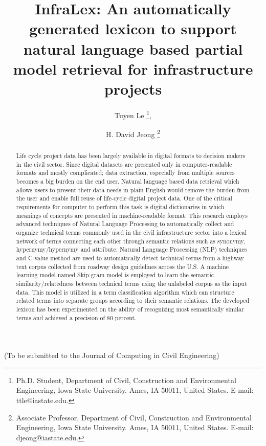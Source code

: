 \documentclass[Journal, InsideFigs, DoubleSpace]{ascelike} %
\begin{document}
\title{InfraLex: An automatically generated lexicon to support natural language based partial model retrieval for infrastructure projects}
%
\author{
Tuyen Le
\thanks{
Ph.D. Student, Department of Civil, Construction and Environmental Engineering, Iowa State University. Ames, IA 50011, United States. E-mail: ttle@iastate.edu.},
\and
H. David Jeong
\thanks{Associate Professor, Department of Civil, Construction and Environmental Engineering, Iowa State University. Ames, IA 50011, United States. E-mail: djeong@iastate.edu.}
 }

\maketitle
%
\begin{center}
(To be submitted to the Journal of Computing in Civil Engineering) 
\end{center}

\begin{abstract} %
	Life cycle project data has been largely available in digital formats to decision makers in the civil sector. Since digital datasets are presented only in computer-readable formats and mostly complicated; data extraction, especially from multiple sources becomes a big burden on the end user. Natural language based data retrieval which allows users to present their data needs in plain English would remove the burden from the user and enable full reuse of life-cycle digital project data. One of the critical requirements for computer to perform this task is digital dictionaries in which meanings of concepts are presented in machine-readable format. 
	This research employs advanced techniques of Natural Language Processing to automatically collect and organize technical terms commonly used in the civil infrastructure sector into a lexical network of terms connecting each other through semantic relations such as synonymy, hypernymy/hypernymy and attribute. 
	Natural Language Processing (NLP) techniques and C-value method are used to automatically detect technical terms from a highway text corpus collected from roadway design guidelines across the U.S. A machine learning model named Skip-gram model is employed to learn the semantic similarity/relatedness between technical terms using the unlabeled corpus as the input data. This model is utilized in a term classification algorithm which can structure related terms into separate groups according to their semantic relations.
	The developed lexicon has been experimented on the ability of recognizing most semantically similar terms and achieved a precision of 80 percent. 
  
\end{abstract}
\end{document}
